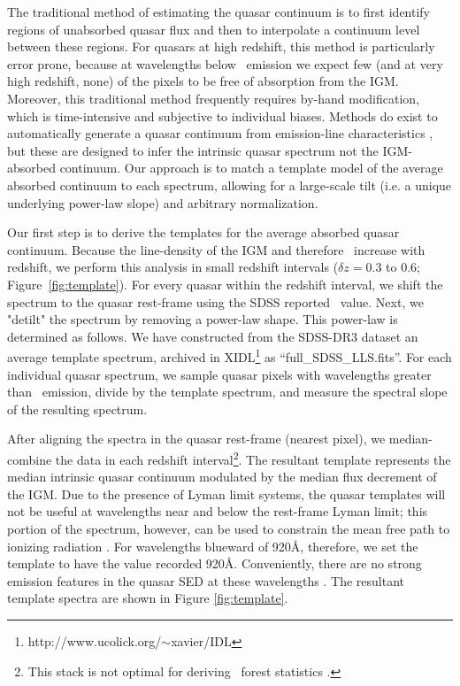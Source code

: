\documentclass[12pt,preprint]{aastex}
\begin{document}
The traditional method of estimating the
quasar continuum is to first identify
regions of unabsorbed quasar flux and then to interpolate a continuum level
between these regions.  For quasars at
high redshift, this method is particularly error prone, because at
wavelengths below \lya\ emission we expect few (and at very
high redshift, none) of the pixels to be free
of absorption from the IGM.   Moreover, this
traditional method frequently requires by-hand modification,
which is time-intensive and subjective to individual biases.
Methods do exist to automatically generate a quasar
continuum from emission-line characteristics \citep[e.g.][]{suzuki+05},
but these are designed to infer the intrinsic quasar spectrum
not the IGM-absorbed continuum.
Our approach is to match a template model of the average absorbed
continuum to each spectrum,
allowing for a large-scale tilt (i.e. a unique underlying power-law slope)
and arbitrary normalization.

Our first step is to derive the templates for the average absorbed
quasar continuum.  Because the line-density of the IGM and therefore \tigm\
increase with redshift, we perform this analysis in small redshift intervals
($\delta z = 0.3$ to 0.6; Figure~\ref{fig:template}). 
For every quasar within the redshift interval,
we shift the spectrum to the quasar rest-frame 
using the SDSS reported \zem\ value.  
Next, we "detilt" the spectrum by removing a power-law shape.
This power-law is determined as follows.  We have
constructed from the SDSS-DR3 dataset an average template spectrum,
archived in XIDL\footnote{http://www.ucolick.org/$\sim$xavier/IDL}
as ``full\_SDSS\_LLS.fits''.
For each individual quasar spectrum,
we sample quasar pixels with wavelengths greater 
than \lya\ emission, divide by the template spectrum,
and measure the spectral slope of the resulting spectrum.

After aligning the spectra in the quasar rest-frame
(nearest pixel), we median-combine the data in each redshift 
interval\footnote{This stack is not optimal for deriving \lya\
forest statistics \citep{dlw08}.}.
The resultant template
represents the median intrinsic quasar continuum modulated by the median
flux decrement of the IGM.  Due to the presence of
Lyman limit systems, the quasar templates will not be useful at
wavelengths near and below the rest-frame Lyman limit;
this portion of the spectrum, however, can be used to 
constrain the mean free path to ionizing radiation \citep{pwo09}.
For wavelengths blueward of 920\AA, therefore,
we set the template to have the value recorded 920\AA.
Conveniently, there are no strong emission features in the
quasar SED at these wavelengths \citep[e.g.][]{telfer02}.
The resultant template spectra are shown in Figure \ref{fig:template}.
\end{document}
